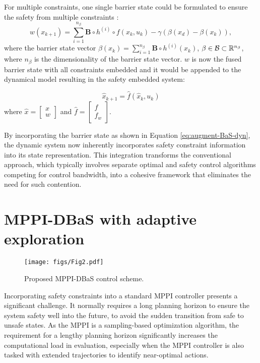 \documentclass[english]{cccconf}
\begin{document}
For multiple constraints, one single barrier state could be formulated to ensure the safety from multiple constraints \cite{almubarak2023barrier}:
 \begin{equation}\label{eq:multi-constraints}
w(x_{k+1})=\sum_{i=1}^{n_\beta} \mathbf{B} \circ h^{(i)} \circ  f(x_k, u_k)-\gamma(\beta(x_d)-\beta(x_k)),
\end{equation}
where the barrier state vector $\beta(x_k) =\sum_{i=1}^{n_\beta} \mathbf{B} \circ h^{(i)} (x_k)$, $ \space  \beta \in \mathcal{B} \subset \mathbb{R}^{n_\beta}$, where $n_\beta$ is the dimensionality of the barrier state vector. $w$ is now the fused barrier state with all constraints embedded and it would be appended to the dynamical model resulting in the safety embedded system:

\begin{equation}\label{eq:augment-BaS-dyn}
\hat{x}_{k+1} = \hat{f}(\hat{x}_k, u_k)
\end{equation}
where $\hat{x} = \begin{bmatrix} x \\ w \end{bmatrix}$ and $\hat{f} = \begin{bmatrix} f \\ f_w \end{bmatrix}$.

By incorporating the barrier state as shown in Equation \eqref{eq:augment-BaS-dyn}, the dynamic system now inherently incorporates safety constraint information into its state representation. This integration transforms the conventional approach, which typically involves separate optimal and safety control algorithms competing for control bandwidth, into a cohesive framework that eliminates the need for such contention.

\section{MPPI-DBaS with adaptive exploration} \label{Sec:method}

\begin{figure*}[!ht]
  \centering
  \texttt{[image: figs/Fig2.pdf]}
  \caption{Proposed MPPI-DBaS control scheme.}
  \label{fig2}
  \vspace{-5mm}
\end{figure*}

Incorporating safety constraints into a standard MPPI controller presents a significant challenge. It normally requires a long planning horizon to ensure the system safety well into the future, to avoid the sudden transition from safe to unsafe states. As the MPPI is a sampling-based optimization algorithm, the requirement for a lengthy planning horizon significantly increases the computational load in evaluation, especially when the MPPI controller is also tasked with extended trajectories to identify near-optimal actions.
\end{document}
